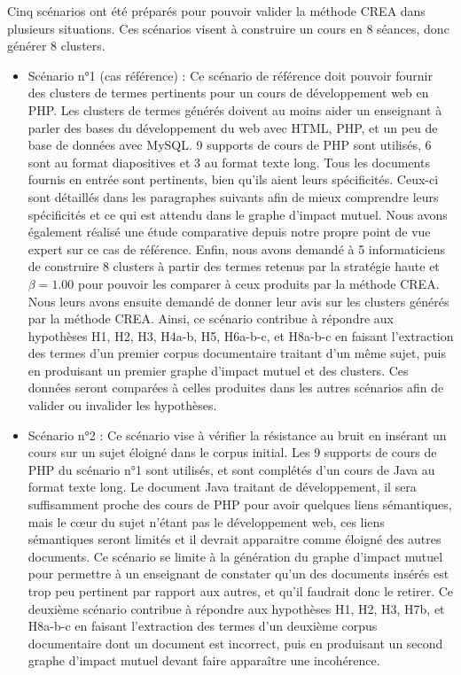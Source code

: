 Cinq scénarios ont été préparés pour pouvoir valider la méthode CREA dans plusieurs situations.
Ces scénarios visent à construire un cours en 8 séances, donc générer 8 clusters.
\begin{itemize}
\item Scénario n°1 (cas référence) : Ce scénario de référence doit pouvoir fournir des clusters de termes pertinents pour un cours de développement web en PHP.
Les clusters de termes générés doivent au moins aider un enseignant à parler des bases du développement du web avec HTML, PHP, et un peu de base de données avec MySQL.
9 supports de cours de PHP sont utilisés, 6 sont au format diapositives et 3 au format texte long.
Tous les documents fournis en entrée sont pertinents, bien qu'ils aient leurs spécificités.
Ceux-ci sont détaillés dans les paragraphes suivants afin de mieux comprendre leurs spécificités et ce qui est attendu dans le graphe d'impact mutuel.
Nous avons également réalisé une étude comparative depuis notre propre point de vue expert sur ce cas de référence.
Enfin, nous avons demandé à 5 informaticiens de construire 8 clusters à partir des termes retenus par la stratégie haute et $ \beta = 1.00 $ pour pouvoir les comparer à ceux produits par la méthode CREA.
Nous leurs avons ensuite demandé de donner leur avis sur les clusters générés par la méthode CREA.
Ainsi, ce scénario contribue à répondre aux hypothèses H1, H2, H3, H4a-b, H5, H6a-b-c, et H8a-b-c en faisant l'extraction des termes d'un premier corpus documentaire traitant d'un même sujet, puis en produisant un premier graphe d'impact mutuel et des clusters.
Ces données seront comparées à celles produites dans les autres scénarios afin de valider ou invalider les hypothèses. \\

\item Scénario n°2 : Ce scénario vise à vérifier la résistance au bruit en insérant un cours sur un sujet éloigné dans le corpus initial.
Les 9 supports de cours de PHP du scénario n°1 sont utilisés, et sont complétés d'un cours de Java au format texte long.
Le document Java traitant de développement, il sera suffisamment proche des cours de PHP pour avoir quelques liens sémantiques, mais le c\oe{}ur du sujet n'étant pas le développement web, ces liens sémantiques seront limités et il devrait apparaitre comme éloigné des autres documents.
Ce scénario se limite à la génération du graphe d'impact mutuel pour permettre à un enseignant de constater qu'un des documents insérés est trop peu pertinent par rapport aux autres, et qu'il faudrait donc le retirer.
Ce deuxième scénario contribue à répondre aux hypothèses H1, H2, H3, H7b, et H8a-b-c en faisant l'extraction des termes d'un deuxième corpus documentaire dont un document est incorrect, puis en produisant un second graphe d'impact mutuel devant faire apparaître une incohérence. \\


\end{itemize}
